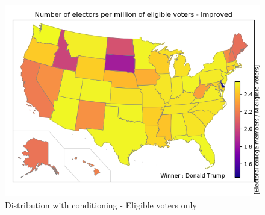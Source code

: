 \documentclass[a4paper,10pt,calibri,oneside,openany, twocolumn]{report}
\theoremstyle{break}
\begin{document}
\begin{figure}[H]
	\centering
	\includegraphics[width=\linewidth]{mapEligibleImproved}
	\caption{Distribution with conditioning - Eligible voters only}
\end{figure}
\end{document}
